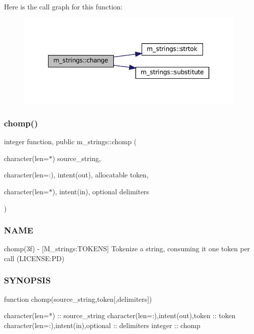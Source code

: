 Here is the call graph for this function\+:\nopagebreak
\begin{figure}[H]
\begin{center}
\leavevmode
\includegraphics[width=341pt]{namespacem__strings_a1222f3b718f7637105bde330367925e1_cgraph}
\end{center}
\end{figure}
\mbox{\label{namespacem__strings_aa3fc15a665eeff512b7f5269029f558d}} 
\subsubsection{\texorpdfstring{chomp()}{chomp()}}
{\footnotesize\ttfamily integer function, public m\+\_\+strings\+::chomp (\begin{DoxyParamCaption}\item[{character(len=$\ast$)}]{source\+\_\+string,  }\item[{character(len=\+:), intent(out), allocatable}]{token,  }\item[{character(len=$\ast$), intent(in), optional}]{delimiters }\end{DoxyParamCaption})}



\subsubsection*{N\+A\+ME}

chomp(3f) -\/ \mbox{[}M\+\_\+strings\+:T\+O\+K\+E\+NS\mbox{]} Tokenize a string, consuming it one token per call (L\+I\+C\+E\+N\+SE\+:PD) 

\subsubsection*{S\+Y\+N\+O\+P\+S\+IS}

\begin{DoxyVerb}function chomp(source_string,token[,delimiters])

 character(len=*)                     :: source_string
 character(len=:),intent(out),token   :: token
 character(len=:),intent(in),optional :: delimiters
 integer                              :: chomp
\end{DoxyVerb}

